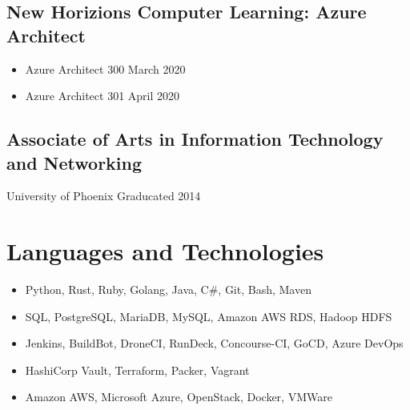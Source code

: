 \documentclass{article}
\begin{document}
    \subsection{New Horizions Computer Learning: Azure Architect}

      \begin{scriptsize}
      \begin{itemize}

          \item Azure Architect 300 \hfill March 2020

          \item Azure Architect 301 \hfill April 2020

      \end{itemize}
      \end{scriptsize}

    \subsection{Associate of Arts in Information Technology and Networking}
      \begin{scriptsize}
      University of Phoenix
      \hfill
      Graducated 2014
      \end{scriptsize}

  \section{Languages and Technologies}

    \begin{scriptsize}
    \begin{itemize}

      \item Python, Rust, Ruby, Golang, Java, C\#, Git, Bash, Maven

      \item SQL, PostgreSQL, MariaDB, MySQL, Amazon AWS RDS, Hadoop HDFS

      \item Jenkins, BuildBot, DroneCI, RunDeck, Concourse-CI, GoCD, Azure
        DevOps

      \item HashiCorp Vault, Terraform, Packer, Vagrant

      \item Amazon AWS, Microsoft Azure, OpenStack, Docker, VMWare

    \end{itemize}
    \end{scriptsize}
\end{document}
